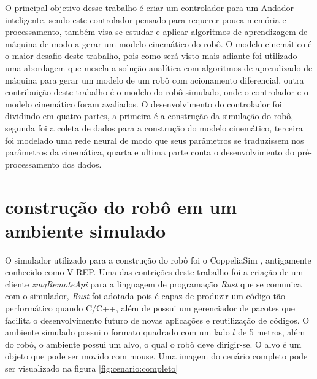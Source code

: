 
\label{Cap:Desenvolvimento}

O principal objetivo desse trabalho é criar um controlador para
um Andador inteligente, sendo este controlador pensado para requerer
pouca memória e processamento, também visa-se estudar e aplicar algoritmos
de aprendizagem de máquina de modo a gerar um modelo cinemático do robô.
O modelo cinemático é o maior desafio deste trabalho, pois como será visto
mais adiante foi utilizado uma abordagem que mescla a solução analítica com
algoritmos de aprendizado de máquina para gerar um modelo de um robô com
acionamento diferencial, outra contribuição deste trabalho é o modelo do
robô simulado, onde o controlador e o modelo cinemático foram avaliados.
O desenvolvimento do controlador foi dividindo em quatro partes, a primeira
é a construção da simulação do robô, segunda foi a coleta de dados para
a construção do modelo cinemático, terceira foi  modelado
uma rede neural de modo que seus parâmetros se traduzissem nos parâmetros
da cinemática, quarta e ultima parte conta o desenvolvimento
do pré-processamento dos dados. 


\section{construção do robô em um ambiente simulado}
O simulador utilizado para a construção do robô foi o CoppeliaSim
\cite{rooban2021coppeliasim}, antigamente conhecido como V-REP.
Uma das contrições deste trabalho foi a criação de um cliente 
\textit{zmqRemoteApi} para a linguagem de programação \textit{Rust}
que se comunica com o simulador, \textit{Rust} foi adotada pois
é capaz de produzir um código tão performático quando C/C++, além
de possui um gerenciador de pacotes que facilita o desenvolvimento
futuro de novas aplicações e reutilização de códigos. O ambiente
simulado possui o formato quadrado com um lado $l$ de 5 metros,
além do robô, o ambiente possui um alvo, o qual o robô deve
dirigir-se. O alvo é um objeto que pode ser movido com mouse. 
Uma imagem do cenário completo pode ser visualizado na figura
\ref{fig:cenario:completo}

